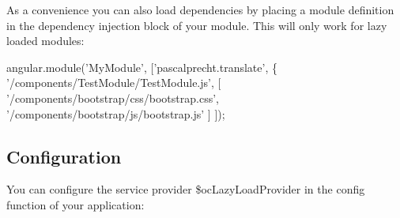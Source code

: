 As a convenience you can also load dependencies by placing a module definition in the dependency injection block of your module. This will only work for lazy loaded modules\+: 
\begin{DoxyCode}
angular.module('MyModule', ['pascalprecht.translate', \{
  '/components/TestModule/TestModule.js',
  [
    '/components/bootstrap/css/bootstrap.css',
    '/components/bootstrap/js/bootstrap.js'
  ]
]);
\end{DoxyCode}


\subsection*{Configuration}

You can configure the service provider {\ttfamily \$oc\+Lazy\+Load\+Provider} in the config function of your application\+:




